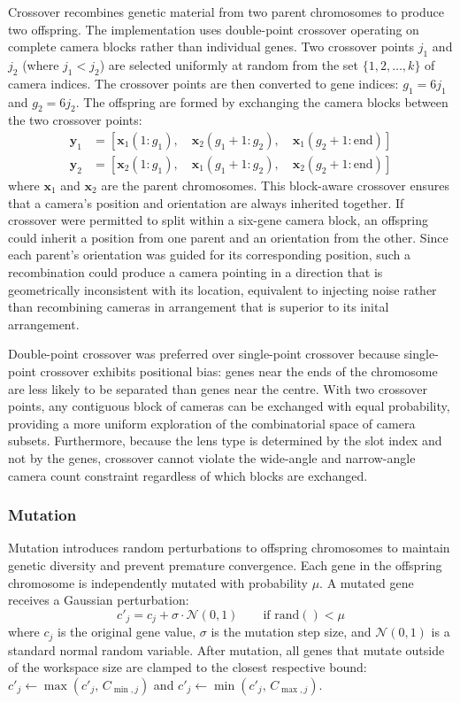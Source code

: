 Crossover recombines genetic material from two parent chromosomes to produce two offspring. The implementation uses double-point crossover operating on complete camera blocks rather than individual genes. Two crossover points $j_1$ and $j_2$ (where $j_1 < j_2$) are selected uniformly at random from the set $\{1, 2, \ldots, k\}$ of camera indices. The crossover points are then converted to gene indices: $g_1 = 6 j_1$ and $g_2 = 6 j_2$. The offspring are formed by exchanging the camera blocks between the two crossover points:
%
\begin{align}
\label{eq:crossover}
\mathbf{y}_1 &= [\mathbf{x}_1(1:g_1),\quad \mathbf{x}_2(g_1{+}1:g_2),\quad \mathbf{x}_1(g_2{+}1:\text{end})] \\
\mathbf{y}_2 &= [\mathbf{x}_2(1:g_1),\quad \mathbf{x}_1(g_1{+}1:g_2),\quad \mathbf{x}_2(g_2{+}1:\text{end})]
\end{align}
%
where $\mathbf{x}_1$ and $\mathbf{x}_2$ are the parent chromosomes. This block-aware crossover ensures that a camera's position and orientation are always inherited together. If crossover were permitted to split within a six-gene camera block, an offspring could inherit a position from one parent and an orientation from the other. Since each parent's orientation was guided for its corresponding position, such a recombination could produce a camera pointing in a direction that is geometrically inconsistent with its location, equivalent to injecting noise rather than recombining cameras in arrangement that is superior to its inital arrangement.

Double-point crossover was preferred over single-point crossover because single-point crossover exhibits positional bias: genes near the ends of the chromosome are less likely to be separated than genes near the centre. With two crossover points, any contiguous block of cameras can be exchanged with equal probability, providing a more uniform exploration of the combinatorial space of camera subsets. Furthermore, because the lens type is determined by the slot index and not by the genes, crossover cannot violate the wide-angle and narrow-angle camera count constraint regardless of which blocks are exchanged.

\subsubsection{Mutation}
\label{sec:mutation}

Mutation introduces random perturbations to offspring chromosomes to maintain genetic diversity and prevent premature convergence. Each gene in the offspring chromosome is independently mutated with probability $\mu$. A mutated gene receives a Gaussian perturbation:
%
\begin{equation}
\label{eq:mutation}
c'_j = c_j + \sigma \cdot \mathcal{N}(0, 1) \qquad \text{if } \text{rand}() < \mu
\end{equation}
%
where $c_j$ is the original gene value, $\sigma$ is the mutation step size, and $\mathcal{N}(0,1)$ is a standard normal random variable. After mutation, all genes that mutate outside of the workspace size are clamped to the closest respective bound: $c'_j \leftarrow \max(c'_j,\, C_{\min,j})$ and $c'_j \leftarrow \min(c'_j,\, C_{\max,j})$.

